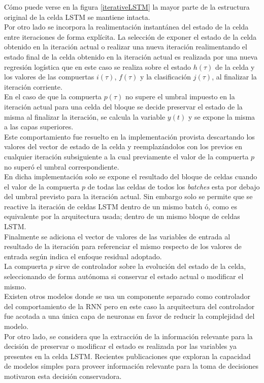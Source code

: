 \documentclass{article}
\begin{document}
	Cómo puede verse en la figura \ref{iterativeLSTM} la mayor parte de la estructura original de la celda LSTM se mantiene intacta. \\
	Por otro lado se incorpora la realimentación instantánea del estado de la celda entre iteraciones de forma explícita. La selección de exponer el estado de la celda obtenido en la iteración actual o realizar una nueva iteración realimentando el estado final de la celda obtenido en la iteración actual es realizada por una nueva regresión logística que en este caso se realiza sobre el estado $h(\tau)$ de la celda y los valores de las compuertas $i(\tau)$, $f(\tau)$ y la clasificación $j(\tau)$, al finalizar la iteración corriente.\\
	En el caso de que la compuerta $p(\tau)$ no supere el umbral impuesto en la iteración actual para una celda del bloque se decide preservar el estado de la misma al finalizar la iteración, se calcula la variable $y(t)$ y se expone la misma a las capas superiores.\\
	Este comportamiento fue resuelto en la implementación provista descartando los valores del vector de estado de la celda y reemplazándolos con los previos en cualquier iteración subsiguiente a la cual previamente el valor de la compuerta $p$ no superó el umbral correspondiente.\\
	En dicha implementación solo se expone el resultado del bloque de celdas cuando el valor de la compuerta $p$ de todas las celdas de todos los \textit{batches} esta por debajo del umbral previsto para la iteración actual. Sin embargo solo se permite que se reactive la iteración de celdas LSTM dentro de un mismo batch ó, como es equivalente por la arquitectura usada; dentro de un mismo bloque de celdas LSTM.\\
	Finalmente se adiciona el vector de valores de las variables de entrada al resultado de la iteración para referenciar el mismo respecto de los valores de entrada según indica el enfoque residual adoptado\cite{28ResidualLearning}.\\
	
	La compuerta $p$ sirve de controlador sobre la evolución del estado de la celda, seleccionando de forma autónoma si conservar el estado actual o modificar el mismo.\\
	Existen otros modelos donde se usa un componente separado como controlador del comportamiento de la RNN\cite{18DifferentiableNeuralComputer, 30NeuralTuringMachines, 31NeuralTuringMachinesRevised} pero en este caso la arquitectura del controlador fue acotada a una única capa de neuronas en favor de reducir la complejidad del modelo. \\
	Por otro lado, se considera que la extracción de la información relevante para la decisión de preservar o modificar el estado es realizada por las variables ya presentes en la celda LSTM. Recientes publicaciones que exploran la capacidad de modelos simples para proveer información relevante para la toma de decisiones motivaron esta decisión conservadora\cite{32WideDeepLearning}.\\
	
\end{document}
